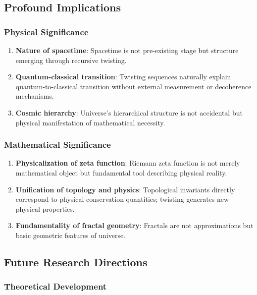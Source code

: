 \documentclass[11pt]{article}
\begin{document}
\subsection{Profound Implications}

\subsubsection{Physical Significance}

\begin{enumerate}
\item \textbf{Nature of spacetime}: Spacetime is not pre-existing stage but structure emerging through recursive twisting.

\item \textbf{Quantum-classical transition}: Twisting sequences naturally explain quantum-to-classical transition without external measurement or decoherence mechanisms.

\item \textbf{Cosmic hierarchy}: Universe's hierarchical structure is not accidental but physical manifestation of mathematical necessity.
\end{enumerate}

\subsubsection{Mathematical Significance}

\begin{enumerate}
\item \textbf{Physicalization of zeta function}: Riemann zeta function is not merely mathematical object but fundamental tool describing physical reality.

\item \textbf{Unification of topology and physics}: Topological invariants directly correspond to physical conservation quantities; twisting generates new physical properties.

\item \textbf{Fundamentality of fractal geometry}: Fractals are not approximations but basic geometric features of universe.
\end{enumerate}

\subsection{Future Research Directions}

\subsubsection{Theoretical Development}
\end{document}
